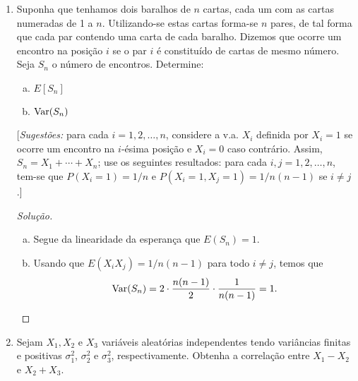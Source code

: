 \documentclass[../Notas.tex]{subfiles}
\begin{document}
\begin{enumerate}
\begin{proof}[Solução]
\begin{enumerate}[a)]
            \[
            \Var(\overline{X}) = \Var(S_n/n) = \Var(S_n)/n^2 = \sigma^2/n.
            \]
            \item Temos
            \begin{align*}
                E \left[ \sum_{i=1}^n (X_i - \overline{X})^2 \right] 
                &= \sum_{i=1}^n E[(X_i - \overline{X})^2] \\
                &= n\sigma^2 + 2n\mu^2 + \sigma^2 - \frac{2}{n}\sum_{i=1}^n E[X_i(X_1+\cdots+X_n)] \\
                &= (n-1)\sigma^2.
            \end{align*}
        \end{enumerate}
    \end{proof}
    \item Suponha que tenhamos dois baralhos de $n$ cartas, cada um com as cartas numeradas de 1 a $n$. Utilizando-se estas cartas forma-se $n$ pares, de tal forma que cada par contendo uma carta de cada baralho. Dizemos que ocorre um encontro na posição $i$ se o par $i$ é constituído de cartas de mesmo número. Seja $S_n$ o número de encontros. Determine:
    \begin{enumerate}[a)]
    \item $E[S_n]$
    \item $\text{Var}(S_n)$
    \end{enumerate}
    [\textit{Sugestões:} para cada $i = 1,2,\dots, n$, considere a v.a. $X_i$ definida por $X_i = 1$ se ocorre um encontro na $i$-ésima posição e $X_i = 0$ caso contrário. Assim, $S_n = X_1 + \cdots + X_n$; use os seguintes resultados: para cada $i, j = 1,2,\dots,n$, tem-se que $P(X_i = 1) = 1/n$ e $P(X_i = 1, X_j = 1) = 1/n(n-1)$ se $i\neq j$.]
    \begin{proof}[Solução]
        \begin{enumerate}[a)]
            \item Segue da linearidade da esperança que $E(S_n) = 1.$
            \item Usando que $E(X_iX_j) = 1/n(n-1)$ para todo $i\neq j$, temos que
            \[
            \text{Var}(S_n) = 2\cdot\frac{n(n-1)}{2}\cdot\frac{1}{n(n-1)} = 1.
            \]
        \end{enumerate}
    \end{proof}
    \item Sejam $X_1, X_2$ e $X_3$ variáveis aleatórias independentes tendo variâncias finitas e positivas $\sigma_1^2$, $\sigma_2^2$ e $\sigma_3^2$, respectivamente. Obtenha a correlação entre $X_1 - X_2$ e $X_2 + X_3$.

\end{enumerate}
\end{document}
